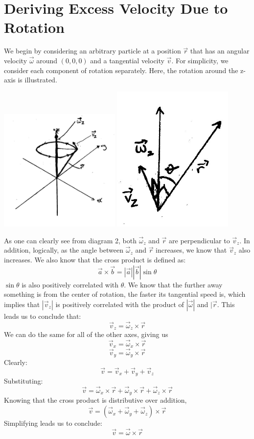 \documentclass{article}
\begin{document}
\section{Deriving Excess Velocity Due to Rotation}
We begin by considering an arbitrary particle at a position $\vec{r}$ that has an angular velocity $\vec{\omega}$ around $(0,0,0)$ and a tangential velocity $\vec{v}$. For simplicity, we consider each component of rotation separately. Here, the rotation around the z-axis is illustrated.
\begin{center}
    \includegraphics[width=6cm]{angular_1}
    \includegraphics[width=6cm]{angular_2}
\end{center}

As one can clearly see from diagram 2, both $\vec{\omega}_z$ and $\vec{r}$ are perpendicular to $\vec{v}_z$. In addition, logically, as the angle between $\vec{\omega}_z$ and $\vec{r}$ increases, we know that $\vec{v}_z$ also increases. We also know that the cross product is defined as:
\[
    \vec{a} \times \vec{b} = |\vec{a}||\vec{b}|\sin \theta
\]
$\sin \theta$ is also positively correlated with $\theta$. We know that the further away something is from the center of rotation, the faster its tangential speed is, which implies that $|\vec{v}_z|$ is positively correlated with the product of $|\vec{\omega}|$ and $|\vec{r}$. This leads us to conclude that:
\[
    \vec{v}_z = \vec{\omega}_z \times \vec{r}
\]
We can do the same for all of the other axes, giving us
\[
    \vec{v}_x = \vec{\omega}_x \times \vec{r}
\]
\[
    \vec{v}_y = \vec{\omega}_y \times \vec{r}
\]
Clearly:
\[
    \vec{v} = \vec{v}_x + \vec{v}_y + \vec{v}_z
\]
Substituting:
\[
    \vec{v} = \vec{\omega}_x \times \vec{r} +
    \vec{\omega}_y \times \vec{r} +
    \vec{\omega}_z \times \vec{r}
\]
Knowing that the cross product is distributive over addition,
\[
    \vec{v} = (\vec{\omega}_x + \vec{\omega}_y + \vec{\omega}_z) \times \vec{r}
\]
Simplifying leads us to conclude:
\[
    \vec{v} = \vec{\omega} \times \vec{r}
\]
\end{document}
